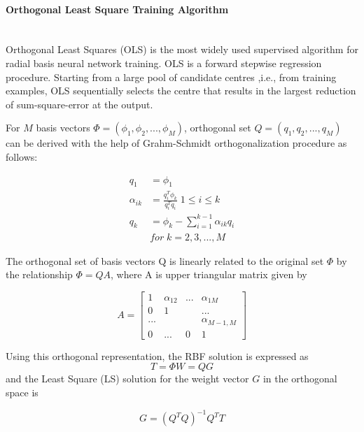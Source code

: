 \documentclass[12pt,a4paper,oneside]{article}
\numberwithin{equation}{section}
\numberwithin{algorithm}{section}
\begin{document}
	\paragraph{Orthogonal Least Square Training Algorithm\\\\}\label{ols}
	
	Orthogonal Least Squares (OLS) is the most widely used supervised algorithm for radial basis neural network training. OLS is a forward stepwise regression procedure. Starting from a large pool of candidate centres ,i.e., from training examples, OLS sequentially selects the centre that results in the largest reduction of sum-square-error at the output.
	
	For $M$ basis vectors $\Phi=(\phi_1,\phi_2,...,\phi_M)$, orthogonal set $Q=(q_1,q_2,...,q_M)$ can be derived with the help of Grahm-Schmidt orthogonalization procedure as follows:
	
	\begin{align}
	q_1&=\phi_1 \label{q1} \\
	\alpha_{ik}&=\frac{q^T_i\phi_k}{q^T_iq_i} \; 1\le i \le k \label{alpha_ik}\\
	q_k&=\phi_k-\sum\limits_{i=1}^{k-1}\alpha_{ik}q_i \label{qk}\\
	& for \; k=2,3,...,M \nonumber
	\end{align}
	
	The orthogonal set of basis vectors Q is linearly related to the original set $\Phi$ by the relationship \cite{Chen1991} $ \Phi=QA \label{orthogonal_representation}$, where A is upper triangular matrix given by
	
	\begin{equation}
	A=
	\begin{bmatrix}
	1&\alpha_{12}&...&\alpha_{1M}\\
	0&1&&...\\
	...&&&\alpha_{M-1,M}\\
	0&...&0&1
	\end{bmatrix}
	\end{equation}
	
	Using this orthogonal representation, the RBF solution is expressed as
	\begin{equation}
	T=\Phi W= QG
	\end{equation}
	and the Least Square (LS) solution for the weight vector $G$ in the orthogonal space is
	
	\begin{equation}
	G=(Q^TQ)^{-1}Q^TT
	\end{equation}
	
\end{document}
